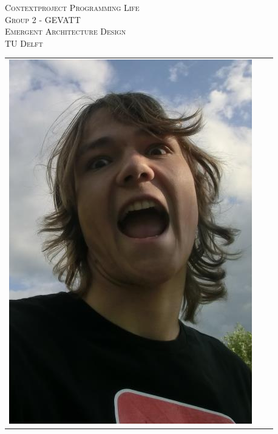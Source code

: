\begin{titlepage}
\begin{center}
\textsc{\LARGE Contextproject Programming Life}\\
\vspace{5pt}
\textsc{\LARGE Group 2 - GEVATT}\\
\vspace{5pt}
\textsc{\LARGE Emergent Architecture Design}\\
\vspace{5pt}
\textsc{\large TU Delft}

\begin{table}[ht]
\centering
\begin{tabular}{ccc}
\includegraphics[scale=0.2]{ruben.png}   &

\end{tabular}
\end{table}
\end{center}
\end{titlepage}
